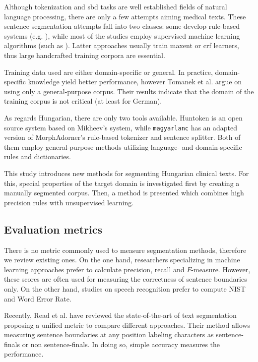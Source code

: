 Although tokenization and \acrshort{sbd} tasks are well established fields of natural language processing, there are only a few attempts aiming medical texts. 
These sentence segmentation attempts fall into two classes: some develop rule-based systems (e.g. \cite{XuSDJWD10}), while most of the studies employ supervised machine learning algorithms (such as \cite{apostolova2009automatic,cho2002text,Savova2010,taira2001automatic,tomanek2007sentence}).
Latter approaches usually train \acrlong{maxent} or \acrshort{crf} learners, thus large handcrafted training corpora are essential. 

Training data used are either domain-specific or general. 
In practice, domain-specific knowledge yield better performance, however Tomanek et al.  \cite{tomanek2006reappraisal} argue on using only a general-purpose corpus. 
Their results indicate that the domain of the training corpus is not critical (at least for German).

As regards Hungarian, there are only two tools available. 
Huntoken \cite{Halacsy2004} is an open source system based on Mikheev’s system, while \texttt{magyarlanc} \cite{zsibrata2013magyarlanc} has an adapted version of MorphAdorner’s rule-based tokenizer \cite{kumar2009monk} and sentence splitter. 
Both of them employ general-purpose methods utilizing language- and domain-specific rules and dictionaries.

This study introduces new methods for segmenting Hungarian clinical texts.
For this, special properties of the target domain is investigated first by creating a manually segmented corpus. 
Then, a method is presented which combines high precision rules with unsupervised learning.

\subsection{Evaluation metrics}
\label{sec:metric}

There is no metric commonly used to measure segmentation methods, therefore we review existing ones.
On the one hand, researchers specializing in machine learning approaches prefer to calculate precision, recall and $F$-measure. 
However, these scores are often used for measuring the correctness of sentence boundaries only.
On the other hand, studies on speech recognition prefer to compute NIST and Word Error Rate. 

Recently, Read et al. have reviewed \cite{read2012sentence} the state-of-the-art of text segmentation proposing a unified metric to compare different approaches. 
Their method allows measuring sentence boundaries at any position labeling characters as sentence-finals or non sentence-finals. 
In doing so, simple accuracy measures the performance. 

